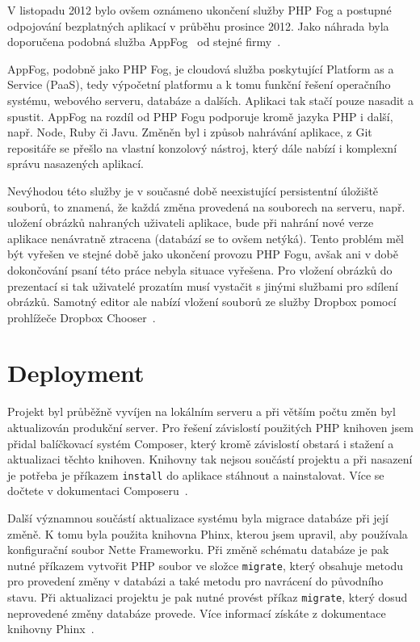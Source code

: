 \documentclass[11pt,twoside,a4paper]{book}
\newcommand*{\nomExpl}[2]{#2 (#1)\nomenclature{#1}{#2}} 	%
\begin{document}
V listopadu 2012 bylo ovšem oznámeno ukončení služby PHP Fog a postupné odpojování bezplatných aplikací v průběhu prosince 2012. Jako náhrada byla doporučena podobná služba AppFog~\cite{appfog} od stejné firmy~\cite{phpfogdiscont}.

AppFog, podobně jako PHP Fog, je cloudová služba poskytující \nomExpl{PaaS}{Platform as a Service}, tedy výpočetní platformu a k tomu funkční řešení operačního systému, webového serveru, databáze a dalších. Aplikaci tak stačí pouze nasadit a spustit. AppFog na rozdíl od PHP Fogu podporuje kromě jazyka PHP i další, např. Node, Ruby či Javu. Změněn byl i způsob nahrávání aplikace, z Git repositáře se přešlo na vlastní konzolový nástroj, který dále nabízí i komplexní správu nasazených aplikací.

Nevýhodou této služby je v současné době neexistující persistentní úložiště souborů, to znamená, že každá změna provedená na souborech na serveru, např. uložení obrázků nahraných uživateli aplikace, bude při nahrání nové verze aplikace nenávratně ztracena (databází se to ovšem netýká). Tento problém měl být vyřešen ve stejné době jako ukončení provozu PHP Fogu, avšak ani v době dokončování psaní této práce nebyla situace vyřešena. Pro vložení obrázků do prezentací si tak uživatelé prozatím musí vystačit s jinými službami pro sdílení obrázků. Samotný editor ale nabízí vložení souborů ze služby Dropbox pomocí prohlížeče Dropbox Chooser~\cite{dropboxchooser}.

\section{Deployment}
Projekt byl průběžně vyvíjen na lokálním serveru a při větším počtu změn byl aktualizován produkční server. Pro řešení závislostí použitých PHP knihoven jsem přidal balíčkovací systém Composer, který kromě závislostí obstará i stažení a aktualizaci těchto knihoven. Knihovny tak nejsou součástí projektu a při nasazení je potřeba je příkazem \verb|install| do aplikace stáhnout a nainstalovat. Více se dočtete v dokumentaci Composeru~\cite{composer}.

Další významnou součástí aktualizace systému byla migrace databáze při její změně. K tomu byla použita knihovna Phinx, kterou jsem upravil, aby používala konfigurační soubor Nette Frameworku. Při změně schématu databáze je pak nutné příkazem vytvořit PHP soubor ve složce \verb|migrate|, který obsahuje metodu pro provedení změny v databázi a také metodu pro navrácení do původního stavu. Při aktualizaci projektu je pak nutné provést příkaz \verb|migrate|, který dosud neprovedené změny databáze provede. Více informací získáte z dokumentace knihovny Phinx~\cite{phinx}.
\end{document}
